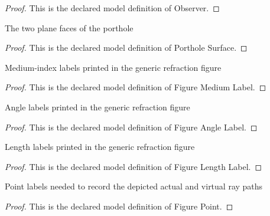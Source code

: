 \begin{proof}
  This is the declared model definition of Observer.
\end{proof}
\begin{definition}
  \label{def:physics:phyx-mini-0158:phyxminiproblems-problemphyxmini0158-portholesurface}
  The two plane faces of the porthole
\end{definition}
\begin{proof}
  This is the declared model definition of Porthole Surface.
\end{proof}
\begin{definition}
  \label{def:physics:phyx-mini-0158:phyxminiproblems-problemphyxmini0158-figuremediumlabel}
  Medium-index labels printed in the generic refraction figure
\end{definition}
\begin{proof}
  This is the declared model definition of Figure Medium Label.
\end{proof}
\begin{definition}
  \label{def:physics:phyx-mini-0158:phyxminiproblems-problemphyxmini0158-figureanglelabel}
  Angle labels printed in the generic refraction figure
\end{definition}
\begin{proof}
  This is the declared model definition of Figure Angle Label.
\end{proof}
\begin{definition}
  \label{def:physics:phyx-mini-0158:phyxminiproblems-problemphyxmini0158-figurelengthlabel}
  Length labels printed in the generic refraction figure
\end{definition}
\begin{proof}
  This is the declared model definition of Figure Length Label.
\end{proof}
\begin{definition}
  \label{def:physics:phyx-mini-0158:phyxminiproblems-problemphyxmini0158-figurepoint}
  Point labels needed to record the depicted actual and virtual ray paths
\end{definition}
\begin{proof}
  This is the declared model definition of Figure Point.
\end{proof}
